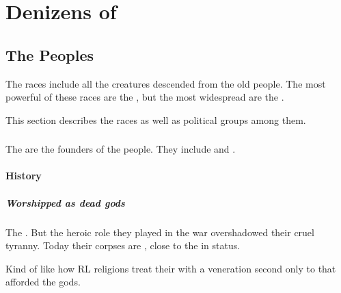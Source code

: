 
\part{Denizens of \Miith}
\chapter{The \Ophidian Peoples}
The \ophidian{} races include all the creatures descended from the old \ophidian{} people. 
The most powerful of these races are the \dragons, but the most widespread are the \scathae. 

This section describes the \ophidian{} races as well as political groups among them. 















\section{\Firstgendragons}
The \firstgendragons{} are the founders of the \draconian{} people. 
They include  and . 









\subsection{History}
\subsubsection{Worshipped as dead gods}
The \firstgendragons{} . 
But the heroic role they played in the war overshadowed their cruel tyranny. 
Today their corpses are , close to the \xss{} in status. 

Kind of like how RL religions treat their  with a veneration second only to that afforded the gods. 


